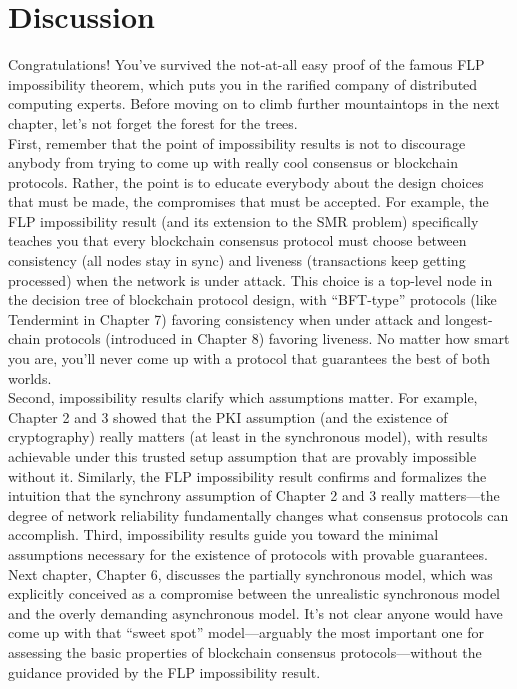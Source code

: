 \section{Discussion}
Congratulations! You've survived the not-at-all easy proof of the famous FLP impossibility
theorem, which puts you in the rarified company of distributed computing experts. Before
moving on to climb further mountaintops in the next chapter, let’s not forget the forest for
the trees.\\
First, remember that the point of impossibility results is not to discourage anybody from
trying to come up with really cool consensus or blockchain protocols. Rather, the point is
to educate everybody about the design choices that must be made, the compromises that
must be accepted. For example, the FLP impossibility result (and its extension to the SMR
problem) specifically teaches you that every blockchain consensus protocol
must choose between consistency (all nodes stay in sync) and liveness (transactions keep
getting processed) when the network is under attack. This choice is a top-level node in the
decision tree of blockchain protocol design, with “BFT-type” protocols (like Tendermint in
Chapter 7) favoring consistency when under attack and longest-chain protocols (introduced
in Chapter 8) favoring liveness. No matter how smart you are, you’ll never come up with a
protocol that guarantees the best of both worlds.\\
Second, impossibility results clarify which assumptions matter. For example, Chapter 2
and 3 showed that the PKI assumption (and the existence of cryptography) really matters
(at least in the synchronous model), with results achievable under this trusted setup assumption that are provably impossible without it. Similarly, the FLP impossibility result confirms and formalizes the intuition that the synchrony assumption of Chapter 2 and 3
really matters—the degree of network reliability fundamentally changes what consensus protocols can accomplish.
Third, impossibility results guide you toward the minimal assumptions necessary for
the existence of protocols with provable guarantees. Next chapter, Chapter 6, discusses the
partially synchronous model, which was explicitly conceived as a compromise between the
unrealistic synchronous model and the overly demanding asynchronous model. It’s not clear
anyone would have come up with that “sweet spot” model—arguably the most important one
for assessing the basic properties of blockchain consensus protocols—without the guidance
provided by the FLP impossibility result.\\
